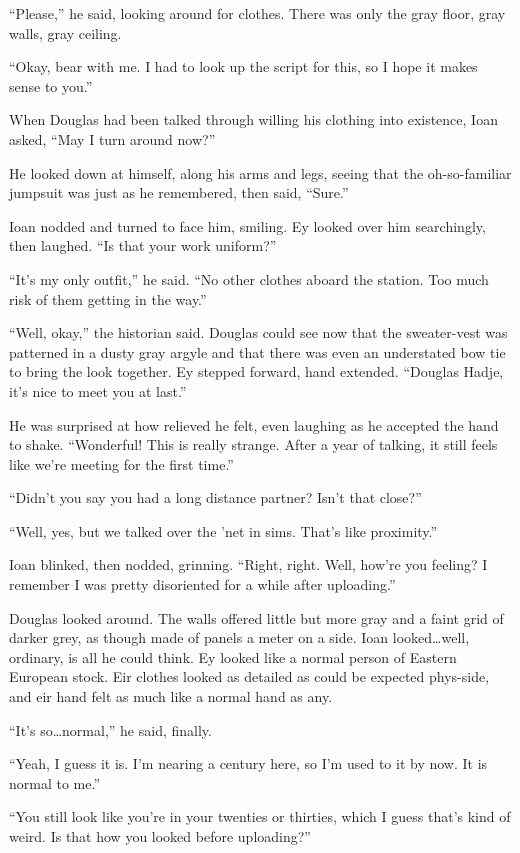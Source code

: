 ``Please,'' he said, looking around for clothes. There was only the gray floor, gray walls, gray ceiling.

``Okay, bear with me. I had to look up the script for this, so I hope it makes sense to you.''

When Douglas had been talked through willing his clothing into existence, Ioan asked, ``May I turn around now?''

He looked down at himself, along his arms and legs, seeing that the oh-so-familiar jumpsuit was just as he remembered, then said, ``Sure.''

Ioan nodded and turned to face him, smiling. Ey looked over him searchingly, then laughed. ``Is that your work uniform?''

``It's my only outfit,'' he said. ``No other clothes aboard the station. Too much risk of them getting in the way.''

``Well, okay,'' the historian said. Douglas could see now that the sweater-vest was patterned in a dusty gray argyle and that there was even an understated bow tie to bring the look together. Ey stepped forward, hand extended. ``Douglas Hadje, it's nice to meet you at last.''

He was surprised at how relieved he felt, even laughing as he accepted the hand to shake. ``Wonderful! This is really strange. After a year of talking, it still feels like we're meeting for the first time.''

``Didn't you say you had a long distance partner? Isn't that close?''

``Well, yes, but we talked over the 'net in sims. That's like proximity.''

Ioan blinked, then nodded, grinning. ``Right, right. Well, how're you feeling? I remember I was pretty disoriented for a while after uploading.''

Douglas looked around. The walls offered little but more gray and a faint grid of darker grey, as though made of panels a meter on a side. Ioan looked\ldots well, ordinary, is all he could think. Ey looked like a normal person of Eastern European stock. Eir clothes looked as detailed as could be expected phys-side, and eir hand felt as much like a normal hand as any.

``It's so\ldots normal,'' he said, finally.

``Yeah, I guess it is. I'm nearing a century here, so I'm used to it by now. It is normal to me.''

``You still look like you're in your twenties or thirties, which I guess that's kind of weird. Is that how you looked before uploading?''

